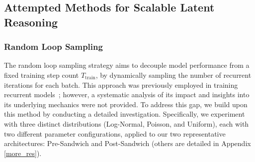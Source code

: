 \subsection{Attempted Methods for Scalable Latent Reasoning}
\label{sec:Attempted Methods}
    \subsubsection{Random Loop Sampling}
    The random loop sampling strategy aims to decouple model performance from a fixed training step count $T_{\text{train}}$, by dynamically sampling the number of recurrent iterations for each batch. This approach was previously employed in training recurrent models~\citep{geiping2025scaling}; however, a systematic analysis of its impact and insights into its underlying mechanics were not provided. To address this gap, we build upon this method by conducting a detailed investigation. Specifically, we experiment with three distinct distributions (Log-Normal, Poisson, and Uniform), each with two different parameter configurations, applied to our two representative architectures: Pre-Sandwich and Post-Sandwich (others are detailed in Appendix \ref{more_res}).


